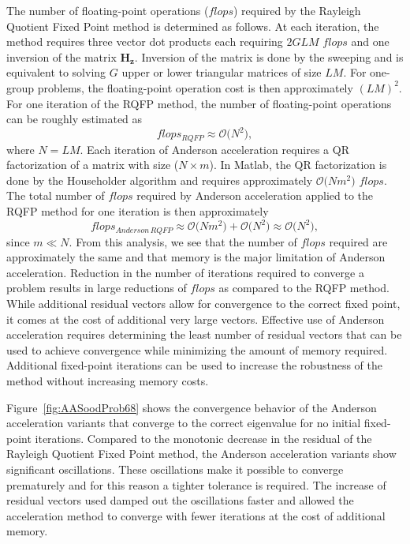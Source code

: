 The number of floating-point operations ($flops$) required by the Rayleigh Quotient Fixed Point method is determined as follows. At each iteration, the method requires three vector dot products each requiring $2GLM$ $flops$ and one inversion of the matrix $\mathbf{H_{\mathbf{z}}}$. Inversion of the matrix is done by the sweeping and is equivalent to solving $G$ upper or lower triangular matrices of size $LM$. For one-group problems, the floating-point operation cost is then approximately $(LM)^{2}$. For one iteration of the RQFP method, the number of floating-point operations can be roughly estimated as
\begin{equation}
	flops_{RQFP} \approx \mathcal{O} \big ( N^{2} \big ), %
\end{equation}
where $N = LM$. Each iteration of Anderson acceleration requires a QR factorization of a matrix with size ($N \times m$). In Matlab, the QR factorization is done by the Householder algorithm \cite{trefethen_1997_numerical} and requires approximately $\mathcal{O}\big(N m^{2} \big )$ $flops$. The total number of $flops$ required by Anderson acceleration applied to the RQFP method for one iteration is then approximately
\begin{equation}
	flops_{Anderson\,RQFP} \approx \mathcal{O}\big(N m^{2} \big ) + \mathcal{O} \big ( N^{2} \big ) \approx \mathcal{O} \big ( N^{2} \big ),%
\end{equation}
since $m \ll N$. From this analysis, we see that the number of $flops$ required are approximately the same and that memory is the major limitation of Anderson acceleration. Reduction in the number of iterations required to converge a problem results in large reductions of $flops$ as compared to the RQFP method. While additional residual vectors allow for convergence to the correct fixed point, it comes at the cost of additional very large vectors. Effective use of Anderson acceleration requires determining the least number of residual vectors that can be used to achieve convergence while minimizing the amount of memory required. Additional fixed-point iterations can be used to increase the robustness of the method without increasing memory costs.

Figure~\ref{fig:AASoodProb68} shows the convergence behavior of the Anderson acceleration variants that converge to the correct eigenvalue for no initial fixed-point iterations. Compared to the monotonic decrease in the residual of the Rayleigh Quotient Fixed Point method, the Anderson acceleration variants show significant oscillations. These oscillations make it possible to converge prematurely and for this reason a tighter tolerance is required. The increase of residual vectors used damped out the oscillations faster and allowed the acceleration method to converge with fewer iterations at the cost of additional memory.

